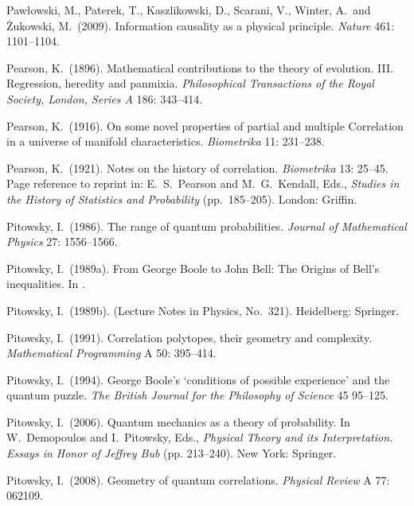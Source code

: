 \documentclass[12pt]{article}
\numberwithin{equation}{section}
\begin{document}
\begin{thebibliography}{}
 Paw{\l}owski, M., Paterek, T., Kaszlikowski, D., Scarani, V., Winter, A.\ and {\.Z}ukowski, M.\  (2009). Information causality as a physical principle. \emph{Nature} 461: 1101--1104.

 Pearson, K.\ (1896). Mathematical contributions to the theory of evolution. III. Regression, heredity and panmixia. \emph{Philosophical Transactions of the Royal Society, London, Series A} 186: 343--414.

 Pearson, K.\ (1916). On some novel properties of partial and multiple Correlation in a universe of manifold characteristics. \emph{Biometrika} 11: 231--238.

 Pearson, K.\ (1921). Notes on the history of correlation. \emph{Biometrika} 13: 25--45. Page reference to reprint in: E.\ S.\ Pearson and M.\ G.\ Kendall, Eds., \emph{Studies in the History of Statistics and Probability} (pp.\ 185--205). London: Griffin.  

 Pitowsky, I.\ (1986). The range of quantum probabilities. \emph{Journal of Mathematical Physics} 27: 1556--1566.

 Pitowsky, I.\ (1989a). From George Boole to John Bell: The Origins of Bell's inequalities. In \citet[pp.\ 37--49]{Kafatos 1989}.

 Pitowsky, I.\ (1989b).   (Lecture Notes in Physics, No.\ 321). Heidelberg: Springer.

 Pitowsky, I.\ (1991). Correlation polytopes, their geometry and complexity. \emph{Mathematical Programming} A 50: 395--414.

 Pitowsky, I.\ (1994). George Boole's `conditions of possible experience' and the quantum puzzle. \emph{The British Journal for the Philosophy of Science} 45 95--125.

 Pitowsky, I.\ (2006). Quantum mechanics as a theory of probability.  In W.\ Demopoulos and I.\ Pitowsky, Eds., \emph{Physical Theory and its Interpretation. Essays in Honor of Jeffrey Bub} (pp. 213--240). New York: Springer.

 Pitowsky, I.\ (2008). Geometry of quantum correlations. \emph{Physical Review} A 77: 062109. 


\end{thebibliography}
\end{document}
